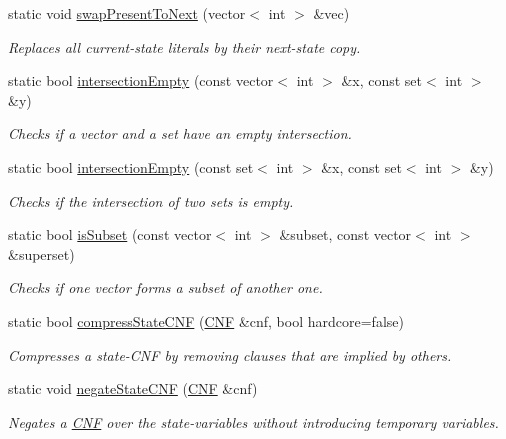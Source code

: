 \begin{DoxyCompactItemize}
static void \hyperlink{classUtils_a8e0d236cf00a61a34ef5c48bcb08a1ec}{swap\-Present\-To\-Next} (vector$<$ int $>$ \&vec)
\begin{DoxyCompactList}\small\item\em Replaces all current-\/state literals by their next-\/state copy. \end{DoxyCompactList}\item 
static bool \hyperlink{classUtils_aa6a513b0ad3b22b3b857060219c222d6}{intersection\-Empty} (const vector$<$ int $>$ \&x, const set$<$ int $>$ \&y)
\begin{DoxyCompactList}\small\item\em Checks if a vector and a set have an empty intersection. \end{DoxyCompactList}\item 
static bool \hyperlink{classUtils_ae957d76f82e729f9d127cf05cb61320d}{intersection\-Empty} (const set$<$ int $>$ \&x, const set$<$ int $>$ \&y)
\begin{DoxyCompactList}\small\item\em Checks if the intersection of two sets is empty. \end{DoxyCompactList}\item 
static bool \hyperlink{classUtils_ab5dca8125b6addaa1f0331664ab6142e}{is\-Subset} (const vector$<$ int $>$ \&subset, const vector$<$ int $>$ \&superset)
\begin{DoxyCompactList}\small\item\em Checks if one vector forms a subset of another one. \end{DoxyCompactList}\item 
static bool \hyperlink{classUtils_ac4e713aa386834b587e2695855fbc27a}{compress\-State\-C\-N\-F} (\hyperlink{classCNF}{C\-N\-F} \&cnf, bool hardcore=false)
\begin{DoxyCompactList}\small\item\em Compresses a state-\/\-C\-N\-F by removing clauses that are implied by others. \end{DoxyCompactList}\item 
static void \hyperlink{classUtils_ad6bc8cf6342b8f182597aa53cf72d9d3}{negate\-State\-C\-N\-F} (\hyperlink{classCNF}{C\-N\-F} \&cnf)
\begin{DoxyCompactList}\small\item\em Negates a \hyperlink{classCNF}{C\-N\-F} over the state-\/variables without introducing temporary variables. \end{DoxyCompactList}\item 

\end{DoxyCompactItemize}
